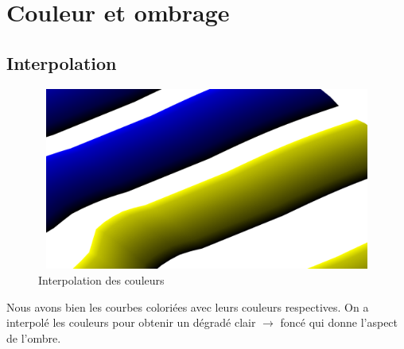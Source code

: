 \documentclass[a4paper,10.5pt]{report}
\begin{document}
    \chapter{Couleur et ombrage}\label{ch:couleur-et-ombrage}
    \section{Interpolation}\label{sec:interpolation}

    \begin{figure}[h!]
        \centering
        \includegraphics[width=13cm, height=6cm]{../interpolation.png}
        \caption{Interpolation des couleurs}
    \end{figure}

    Nous avons bien les courbes coloriées avec leurs couleurs respectives.
    On a interpolé les couleurs pour obtenir un dégradé clair $\to$ foncé qui donne l'aspect de l'ombre.
    \newpage
\end{document}
